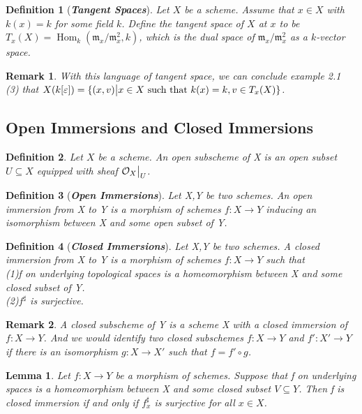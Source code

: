 \documentclass{ctexart}
\newtheorem{definition}{Definition}[section]
\newtheorem{remark}{Remark}[section]
\newtheorem{lemma}{Lemma}[section]
\renewcommand{\hom}{\operatorname{Hom}}
\begin{document}
\begin{definition}[\textbf{\emph{Tangent Spaces}}]
    Let $X$ be a scheme.
    Assume that $x\in X$ with $k(x) = k$ for some field $k$.
    Define the tangent space of $X$ at $x$ to be $T_{x}(X) = \hom_{k}(\mathfrak{m}_{x}/\mathfrak{m}_{x}^{2}, k)$, 
    which is the dual space of $\mathfrak{m}_{x}/\mathfrak{m}_{x}^{2}$ as a $k$-vector space.
\end{definition}
\begin{remark}
    With this language of tangent space, we can conclude example 2.1 (3) that $X(k[\varepsilon]) = \{(x, v) \big{|} x\in X \text{ such that } k(x) = k, v\in T_{x}(X)\}$.
\end{remark}

\subsection{Open Immersions and Closed Immersions}
\begin{definition}
    Let $X$ be a scheme.
    An open subscheme of X is an open subset $U \subseteq X$ equipped with sheaf $\mathcal{O}_{X}\big{|}_{U}$.
\end{definition}
\begin{definition}[\textbf{\emph{Open Immersions}}]
    Let X,Y be two schemes.
    An open immersion from X to Y is a morphism of schemes $f: X \longrightarrow Y$ inducing an isomorphism between X and some open subset of Y.
\end{definition}
\begin{definition}[\textbf{\emph{Closed Immersions}}]
    Let X,Y be two schemes.
    A closed immersion from X to Y is a morphism of schemes $f: X \longrightarrow Y$ such that \\
    (1)f on underlying topological spaces is a homeomorphism between X and some closed subset of Y. \\
    (2)$f^{\sharp}$ is surjective.
\end{definition}
\begin{remark}
    A closed subscheme of Y is a scheme X with a closed immersion of $f: X \longrightarrow Y$.
    And we would identify two closed subschemes $f: X \longrightarrow Y$ and $f': X' \longrightarrow Y$ if there is an isomorphism $g: X \longrightarrow X'$ such that $f = f' \circ g$.
\end{remark}
\begin{lemma}
    Let $f: X \longrightarrow Y$ be a morphism of schemes.
    Suppose that f on underlying spaces is a homeomorphism between X and some closed subset $V \subseteq Y$.
    Then f is closed immersion if and only if $f_{x}^{\sharp}$ is surjective for all $x\in X$.
    \label{Lemma 2.5}
\end{lemma}
\end{document}
